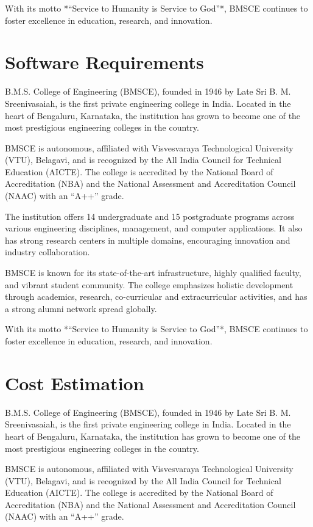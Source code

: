 \documentclass[12pt,a4paper]{report}
\begin{document}
With its motto *“Service to Humanity is Service to God”*, BMSCE continues to foster 
excellence in education, research, and innovation.
\section{Software Requirements  }
B.M.S. College of Engineering (BMSCE), founded in 1946 by Late Sri B. M. Sreenivasaiah, 
is the first private engineering college in India. Located in the heart of Bengaluru, 
Karnataka, the institution has grown to become one of the most prestigious engineering 
colleges in the country. 

BMSCE is autonomous, affiliated with Visvesvaraya Technological University (VTU), Belagavi, 
and is recognized by the All India Council for Technical Education (AICTE). The college is 
accredited by the National Board of Accreditation (NBA) and the National Assessment and 
Accreditation Council (NAAC) with an “A++” grade.

The institution offers 14 undergraduate and 15 postgraduate programs across various 
engineering disciplines, management, and computer applications. It also has strong research 
centers in multiple domains, encouraging innovation and industry collaboration. 

BMSCE is known for its state-of-the-art infrastructure, highly qualified faculty, and vibrant 
student community. The college emphasizes holistic development through academics, research, 
co-curricular and extracurricular activities, and has a strong alumni network spread 
globally. 

With its motto *“Service to Humanity is Service to God”*, BMSCE continues to foster 
excellence in education, research, and innovation.
\section{Cost Estimation }
B.M.S. College of Engineering (BMSCE), founded in 1946 by Late Sri B. M. Sreenivasaiah, 
is the first private engineering college in India. Located in the heart of Bengaluru, 
Karnataka, the institution has grown to become one of the most prestigious engineering 
colleges in the country. 

BMSCE is autonomous, affiliated with Visvesvaraya Technological University (VTU), Belagavi, 
and is recognized by the All India Council for Technical Education (AICTE). The college is 
accredited by the National Board of Accreditation (NBA) and the National Assessment and 
Accreditation Council (NAAC) with an “A++” grade.
\end{document}
